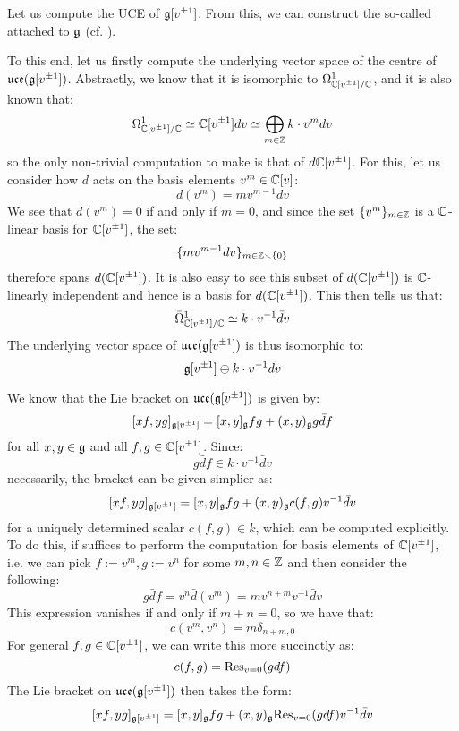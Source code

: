         \begin{example} \label{example: affine_lie_algebras_centres}
            Let us compute the UCE of $\mathfrak{g}[v^{\pm 1}]$. From this, we can construct the so-called  attached to $\mathfrak{g}$ (cf. \cite[Chapter 7]{kac_infinite_dimensional_lie_algebras}). 

            To this end, let us firstly compute the underlying vector space of the centre of $\mathfrak{uce}(\mathfrak{g}[v^{\pm 1}])$. Abstractly, we know that it is isomorphic to $\bar{\Omega}^1_{\mathbb{C}[v^{\pm 1}]/\mathbb{C}}$, and it is also known that:
                $$\Omega^1_{\mathbb{C}[v^{\pm 1}]/\mathbb{C}} \simeq \mathbb{C}[v^{\pm 1}] dv \simeq \bigoplus_{m \in \mathbb{Z}} k \cdot v^m dv$$
            so the only non-trivial computation to make is that of $d \mathbb{C}[v^{\pm 1}]$. For this, let us consider how $d$ acts on the basis elements $v^m \in \mathbb{C}[v]$:
                $$d(v^m) = m v^{m - 1} dv$$
            We see that $d(v^m) = 0$ if and only if $m = 0$, and since the set $\{v^m\}_{m \in \mathbb{Z}}$ is a $\mathbb{C}$-linear basis for $\mathbb{C}[v^{\pm 1}]$, the set:
                $$\{m v^{m - 1} dv\}_{m \in \mathbb{Z} \smallsetminus \{0\}}$$
            therefore spans $d(\mathbb{C}[v^{\pm 1}])$. It is also easy to see this subset of $d(\mathbb{C}[v^{\pm 1}])$ is $\mathbb{C}$-linearly independent and hence is a basis for $d(\mathbb{C}[v^{\pm 1}])$. This then tells us that:
                $$\bar{\Omega}^1_{\mathbb{C}[v^{\pm 1}]/\mathbb{C}} \simeq k \cdot v^{-1} \bar{d}v$$
            The underlying vector space of $\mathfrak{uce}(\mathfrak{g}[v^{\pm 1}])$ is thus isomorphic to:
                $$\mathfrak{g}[v^{\pm 1}] \oplus k \cdot v^{-1} \bar{d}v$$

            We know that the Lie bracket on $\mathfrak{uce}(\mathfrak{g}[v^{\pm 1}])$ is given by:
                $$[x f, y g]_{\mathfrak{g}[v^{\pm 1}]} = [x, y]_{\mathfrak{g}} fg + (x, y)_{\mathfrak{g}} g \bar{d}f$$
            for all $x, y \in \mathfrak{g}$ and all $f, g \in \mathbb{C}[v^{\pm 1}]$. Since:
                $$g \bar{d}f \in k \cdot v^{-1} \bar{d}v$$
            necessarily, the bracket can be given simplier as:
                $$[x f, y g]_{\mathfrak{g}[v^{\pm 1}]} = [x, y]_{\mathfrak{g}} fg + (x, y)_{\mathfrak{g}} c(f, g) v^{-1} \bar{d}v$$
            for a uniquely determined scalar $c(f, g) \in k$, which can be computed explicitly. To do this, if suffices to perform the computation for basis elements of $\mathbb{C}[v^{\pm 1}]$, i.e. we can pick $f := v^m, g := v^n$ for some $m, n \in \mathbb{Z}$ and then consider the following:
                $$g \bar{d}f = v^n \bar{d}(v^m) = m v^{n + m} v^{-1} \bar{d}v$$
            This expression vanishes if and only if $m + n = 0$, so we have that:
                $$c(v^m, v^n) = m \delta_{n + m, 0}$$
            For general $f, g \in \mathbb{C}[v^{\pm 1}]$, we can write this more succinctly as:
                $$c(f, g) = \mathrm{Res}_{v = 0}( gdf )$$
            The Lie bracket on $\mathfrak{uce}(\mathfrak{g}[v^{\pm 1}])$ then takes the form:
                $$[x f, y g]_{\mathfrak{g}[v^{\pm 1}]} = [x, y]_{\mathfrak{g}} fg + (x, y)_{\mathfrak{g}} \mathrm{Res}_{v = 0}(g df) v^{-1} \bar{d}v$$
                

\end{example}
